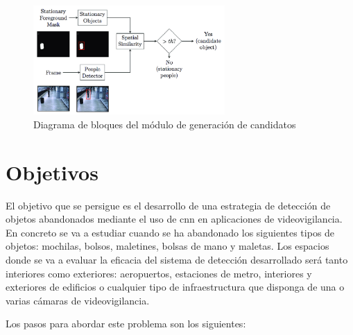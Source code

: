 \begin{figure}[ht]
\centering
\includegraphics[width=0.65\textwidth]{img/chapters/introduccion/Block-diagram-Stationary-detection.png}
\caption{\label{fig:diagram-stationary-detection}Diagrama de bloques del módulo de generación de candidatos \cite{luna2018}}
\end{figure}

\section{Objetivos}
\label{sec:objetivos}

El objetivo que se persigue es el desarrollo de una estrategia de detección de objetos abandonados mediante el uso de \gls{cnn} en aplicaciones de videovigilancia. En concreto se va a estudiar cuando se ha abandonado los siguientes tipos de objetos: mochilas, bolsos, maletines, bolsas de mano y maletas. Los espacios donde se va a evaluar la eficacia del sistema de detección desarrollado será tanto interiores como exteriores: aeropuertos, estaciones de metro, interiores y exteriores de edificios o cualquier tipo de infraestructura que disponga de una o varias cámaras de videovigilancia.

Los pasos para abordar este problema son los siguientes:

